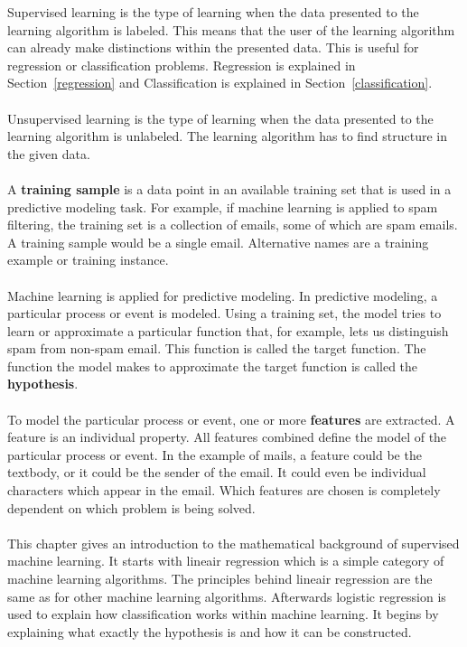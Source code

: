 Supervised learning is the type of learning when the data presented to the learning algorithm is labeled. This means that the user of the learning algorithm can already make distinctions within the presented data. This is useful for regression or classification problems. Regression is explained in Section~\ref{regression} and Classification is explained in Section~\ref{classification}. \\
\\
Unsupervised learning is the type of learning when the data presented to the learning algorithm is unlabeled. The learning algorithm has to find structure in the given data. \\
\\ 
A \textbf{training sample} is a data point in an available training set that is used in a predictive modeling task. For example, if machine learning is applied to spam filtering, the training set is a collection of emails, some of which are spam emails. A training sample would be a single email. Alternative names are a training example or training instance. \\
\\
Machine learning is applied for predictive modeling. In predictive modeling, a particular process or event is modeled. Using a training set, the model tries to learn or approximate a particular function that, for example, lets us distinguish spam from non-spam email. This function is called the target function. The function the model makes to approximate the target function is called the \textbf{hypothesis}. \\
\\
To model the particular process or event, one or more \textbf{features} are extracted. A feature is an individual property. All features combined define the model of the particular process or event. In the example of mails, a feature could be the textbody, or it could be the sender of the email. It could even be individual characters which appear in the email. Which features are chosen is completely dependent on which problem is being solved. \\\\
This chapter gives an introduction to the mathematical background of supervised machine learning. It starts with lineair regression which is a simple category of machine learning algorithms. The principles behind lineair regression are the same as for other machine learning algorithms. Afterwards logistic regression is used to explain how classification works within machine learning. It begins by explaining what exactly the hypothesis is and how it can be constructed. \cite{courseraLectures}
